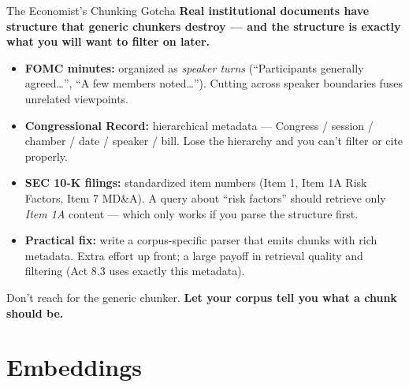 \begin{frame}{The Economist's Chunking Gotcha}
\textbf{Real institutional documents have structure that generic chunkers destroy --- and the structure is exactly what you will want to filter on later.}

\medskip
\begin{itemize}
\item \textbf{FOMC minutes:} organized as \emph{speaker turns} (``Participants generally agreed\dots'', ``A few members noted\dots''). Cutting across speaker boundaries fuses unrelated viewpoints.

\medskip
\item \textbf{Congressional Record:} hierarchical metadata --- Congress / session / chamber / date / speaker / bill. Lose the hierarchy and you can't filter or cite properly.

\medskip
\item \textbf{SEC 10-K filings:} standardized item numbers (Item 1, Item 1A Risk Factors, Item 7 MD\&A). A query about ``risk factors'' should retrieve only \emph{Item 1A} content --- which only works if you parse the structure first.

\medskip
\item \textbf{Practical fix:} write a corpus-specific parser that emits chunks with rich metadata. Extra effort up front; a large payoff in retrieval quality and filtering (Act 8.3 uses exactly this metadata).
\end{itemize}

\medskip
\begin{takeawaybox}
Don't reach for the generic chunker. \textbf{Let your corpus tell you what a chunk should be.}
\end{takeawaybox}
\end{frame}

\section{Embeddings}

